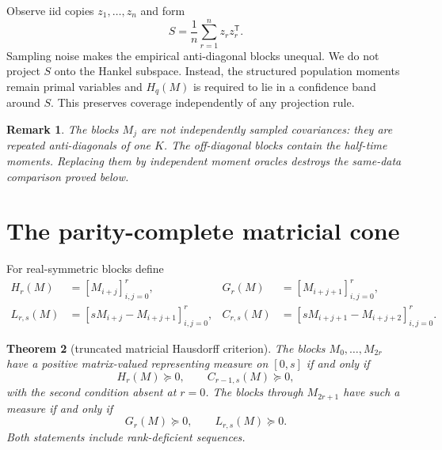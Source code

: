 \documentclass[11pt]{article}
\newtheorem{theorem}{Theorem}[section]
\newtheorem{remark}[theorem]{Remark}
\begin{document}
Observe iid copies $z_1,\ldots,z_n$ and form
\[
 S=\frac1n\sum_{r=1}^n z_rz_r^\mathsf T.                           \tag{2.5}
\]
Sampling noise makes the empirical anti-diagonal blocks unequal.  We do not
project $S$ onto the Hankel subspace.  Instead, the structured population
moments remain primal variables and $H_q(M)$ is required to lie in a
confidence band around $S$.  This preserves coverage independently of any
projection rule.

\begin{remark}
The blocks $M_j$ are not independently sampled covariances: they are repeated
anti-diagonals of one $K$.  The off-diagonal blocks contain the half-time
moments.  Replacing them by independent moment oracles destroys the same-data
comparison proved below.
\end{remark}

\section{The parity-complete matricial cone}

For real-symmetric blocks define
\[
\begin{aligned}
 H_r(M)&=[M_{i+j}]_{i,j=0}^r,&
 G_r(M)&=[M_{i+j+1}]_{i,j=0}^r,\\
 L_{r,s}(M)&=[sM_{i+j}-M_{i+j+1}]_{i,j=0}^r,&
 C_{r,s}(M)&=[sM_{i+j+1}-M_{i+j+2}]_{i,j=0}^r.
\end{aligned}                                                       \tag{3.1}
\]

\begin{theorem}[truncated matricial Hausdorff criterion]\label{thm:cone}
The blocks $M_0,\ldots,M_{2r}$ have a positive matrix-valued representing
measure on $[0,s]$ if and only if
\[
 H_r(M)\succeq0,\qquad C_{r-1,s}(M)\succeq0,                      \tag{3.2}
\]
with the second condition absent at $r=0$.  The blocks through $M_{2r+1}$
have such a measure if and only if
\[
 G_r(M)\succeq0,\qquad L_{r,s}(M)\succeq0.                        \tag{3.3}
\]
Both statements include rank-deficient sequences.
\end{theorem}
\end{document}
